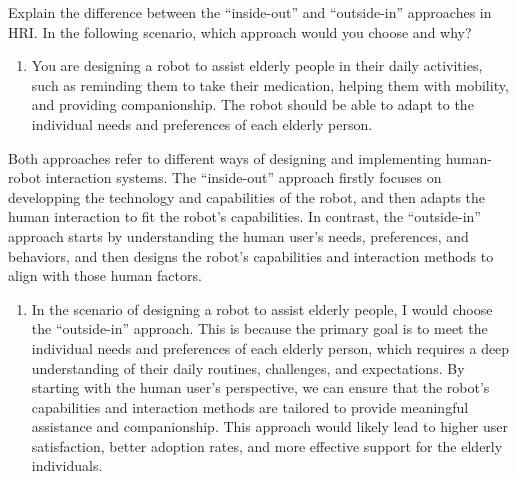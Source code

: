 \begin{ejercicio}
    Explain the difference between the ``inside-out'' and ``outside-in'' approaches in HRI. In the following scenario, which approach would you choose and why?
    \begin{enumerate}
        \item You are designing a robot to assist elderly people in their daily activities, such as reminding them to take their medication, helping them with mobility, and providing companionship. The robot should be able to adapt to the individual needs and preferences of each elderly person.
    \end{enumerate}

    Both approaches refer to different ways of designing and implementing human-robot interaction systems. The ``inside-out'' approach firstly focuses on developping the technology and capabilities of the robot, and then adapts the human interaction to fit the robot's capabilities. In contrast, the ``outside-in'' approach starts by understanding the human user's needs, preferences, and behaviors, and then designs the robot's capabilities and interaction methods to align with those human factors.
    \begin{enumerate}
        \item In the scenario of designing a robot to assist elderly people, I would choose the ``outside-in'' approach. This is because the primary goal is to meet the individual needs and preferences of each elderly person, which requires a deep understanding of their daily routines, challenges, and expectations. By starting with the human user's perspective, we can ensure that the robot's capabilities and interaction methods are tailored to provide meaningful assistance and companionship. This approach would likely lead to higher user satisfaction, better adoption rates, and more effective support for the elderly individuals.
    \end{enumerate}
\end{ejercicio}

